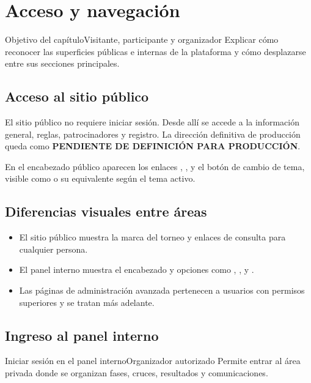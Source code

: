 \chapter{Acceso y navegación}
\label{cap:acceso-navegacion}

\begin{procedimiento}{Objetivo del capítulo}{Visitante, participante y organizador}
Explicar cómo reconocer las superficies públicas e internas de la plataforma y cómo desplazarse entre sus secciones principales.
\end{procedimiento}

\section{Acceso al sitio público}

El sitio público no requiere iniciar sesión. Desde allí se accede a la información general, reglas, patrocinadores y registro. La dirección definitiva de producción queda como \textbf{PENDIENTE DE DEFINICIÓN PARA PRODUCCIÓN}.

En el encabezado público aparecen los enlaces , ,  y el botón de cambio de tema, visible como  o su equivalente según el tema activo.

\section{Diferencias visuales entre áreas}

\begin{itemize}
    \item El sitio público muestra la marca del torneo y enlaces de consulta para cualquier persona.
    \item El panel interno muestra el encabezado  y opciones como , ,  y .
    \item Las páginas de administración avanzada pertenecen a usuarios con permisos superiores y se tratan más adelante.
\end{itemize}

\section{Ingreso al panel interno}

\begin{procedimiento}{Iniciar sesión en el panel interno}{Organizador autorizado}
Permite entrar al área privada donde se organizan fases, cruces, resultados y comunicaciones.
\end{procedimiento}

